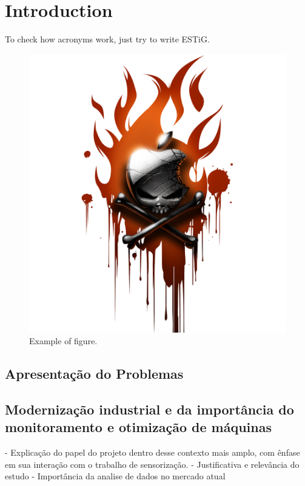 \chapter{Introduction}\label{cap:intro}
To check how acronyms work, just try to write \gls{ESTiG}.

\begin{figure}[htbp]
    \begin{center}
    \includegraphics[scale=0.05]{images/imagem01}
    \end{center}
    \caption{Example of figure.}
    \label{fig:graficosubscricoesmoveis}
\end{figure}


\section[Apresentação do Problemas]{Apresentação do Problemas}
\section[Contextualização]{Modernização industrial e da importância do monitoramento e otimização de máquinas}


- Explicação do papel do projeto dentro desse contexto mais amplo, com ênfase em sua interação com o trabalho de sensorização.
- Justificativa e relevância do estudo
    - Importância da analise de dados no mercado atual